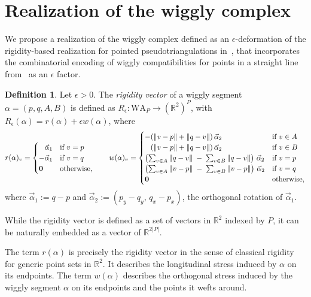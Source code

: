 \documentclass{amsart}
\theoremstyle{definition}
\newtheorem{definition}[theorem]{Definition}
\newcommand{\R}{\mathbb{R}} %
\newcommand{\zero}{{\bf 0}} %
\newcommand{\norm}[1]{{\left\lVert{#1}\right\rVert}} %
\newcommand{\cardinal}[1]{\left\lvert{#1}\right\rvert} %
\newcommand{\wigglyArcs}{\mathrm{WA}} %
\newcommand{\defn}[1]{\textsl{\color{darkblue} #1}} %
\begin{document}
\section{Realization of the wiggly complex}
We propose a realization of the wiggly complex defined as an $\epsilon$-deformation of the
rigidity-based realization for pointed pseudotriangulations in~\cite{RoteSantosStreinu03},
that incorporates the combinatorial encoding of wiggly compatibilities for points in a straight
line from~\cite{BapatPilaud25} as an $\epsilon$ factor.

\begin{definition}
    \label{d:rigidity-vector}
    Let $\epsilon > 0$.
    The \defn{rigidity vector} of a wiggly segment $\alpha = (p, q, A, B)$ is defined as
    $R_\epsilon: \wigglyArcs_P \to (\R^2)^P$, with $R_\epsilon(\alpha) = r(\alpha) + \epsilon w(\alpha)$, where
    \[
        r(\alpha)_v =
        \begin{cases}
            \hphantom{+}\vec{\alpha}_1&\text{if } v = p\\
            -\vec{\alpha}_1&\text{if } v = q\\
            \zero&\text{otherwise},
        \end{cases}
        \quad\quad
        w(\alpha)_v =
        \begin{cases}
            -(\norm{v - p} + \norm{q - v})\, \vec{\alpha}_2&\text{if } v\in A\\
            \hphantom{+}(\norm{v - p} + \norm{q - v})\, \vec{\alpha}_2&\text{if } v\in B\\
            \left(\sum_{v\in A} \norm{q - v}\; - \;\sum_{v\in B} \norm{q - v}\right)\, \vec{\alpha}_2&\text{if } v = p\\
            \left(\sum_{v\in A} \norm{v - p}\; - \;\sum_{v\in B} \norm{v - p}\right)\, \vec{\alpha}_2&\text{if } v = q\\
            \zero&\text{otherwise},
        \end{cases}
    \]
    where $\vec{\alpha}_1 := q - p$ and $\vec{\alpha}_2 := (p_y - q_y,\, q_x - p_x)$,
    the orthogonal rotation of $\vec{\alpha}_1$.
\end{definition}

While the rigidity vector is defined as a set of vectors in $\R^2$ indexed by $P$,
it can be naturally embedded as a vector of $\R^{2\cardinal{P}}$.

The term $r(\alpha)$ is precisely the rigidity vector in the sense of classical rigidity for
generic point sets in $\R^2$.
It describes the longitudinal stress induced by $\alpha$ on its endpoints.
The term $w(\alpha)$ describes the orthogonal stress induced by the wiggly segment $\alpha$ on its endpoints
and the points it wefts around.
\end{document}
